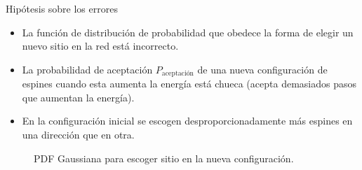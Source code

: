 \documentclass[xcolor=dvipsnames,presentation]{beamer}%
\begin{document}
\begin{frame}{Hipótesis sobre los errores}
\begin{itemize}
\item La función de distribución de probabilidad que obedece 
la forma de elegir un nuevo sitio en la red está incorrecto. 
\item La probabilidad de aceptación $P_{\text{aceptación}}$ de una nueva
configuración de espines cuando esta aumenta la energía está chueca
(acepta demasiados pasos que aumentan la energía).
\item En la configuración inicial se escogen desproporcionadamente 
más espines en una dirección que en otra.
\end{itemize}
\end{frame}

\begin{frame}
\begin{figure}
\centering
{}
\caption{PDF Gaussiana para escoger sitio en la nueva configuración.}
\end{figure}
\end{frame}
\end{document}

